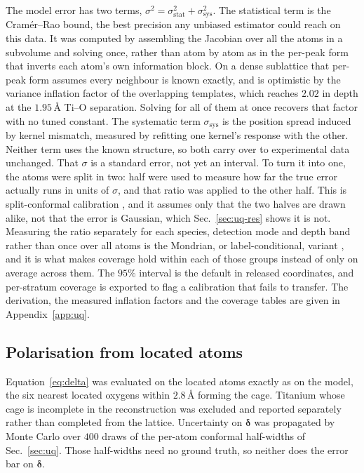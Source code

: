\documentclass[aps,prb,twocolumn,superscriptaddress,floatfix,nofootinbib]{revtex4-2}
\begin{document}
The model error has two terms, $\sigma^2=\sigma^2_{\mathrm{stat}}+\sigma^2_{\mathrm{sys}}$. The statistical term is the Cram\'er--Rao bound, the best precision any unbiased estimator could reach on this data. It was computed by assembling the Jacobian over all the atoms in a subvolume and solving once, rather than atom by atom as in the per-peak form that inverts each atom's own information block. On a dense sublattice that per-peak form assumes every neighbour is known exactly, and is optimistic by the variance inflation factor of the overlapping templates, which reaches $2.02$ in depth at the $1.95$\,\AA{} Ti--O separation. Solving for all of them at once recovers that factor with no tuned constant. The systematic term $\sigma_{\mathrm{sys}}$ is the position spread induced by kernel mismatch, measured by refitting one kernel's response with the other. Neither term uses the known structure, so both carry over to experimental data unchanged. That $\sigma$ is a standard error, not yet an interval. To turn it into one, the atoms were split in two: half were used to measure how far the true error actually runs in units of $\sigma$, and that ratio was applied to the other half. This is split-conformal calibration \citep{Papadopoulos2002}, and it assumes only that the two halves are drawn alike, not that the error is Gaussian, which Sec.~\ref{sec:uq-res} shows it is not. Measuring the ratio separately for each species, detection mode and depth band rather than once over all atoms is the Mondrian, or label-conditional, variant \citep{Vovk2005}, and it is what makes coverage hold within each of those groups instead of only on average across them. The $95\%$ interval is the default in released coordinates, and per-stratum coverage is exported to flag a calibration that fails to transfer. The derivation, the measured inflation factors and the coverage tables are given in Appendix~\ref{app:uq}.

\subsection{Polarisation from located atoms}

Equation~\eqref{eq:delta} was evaluated on the located atoms exactly as on the model, the six nearest located oxygens within $2.8$\,\AA{} forming the cage. Titanium whose cage is incomplete in the reconstruction was excluded and reported separately rather than completed from the lattice. Uncertainty on $\boldsymbol{\delta}$ was propagated by Monte Carlo over $400$ draws of the per-atom conformal half-widths of Sec.~\ref{sec:uq}. Those half-widths need no ground truth, so neither does the error bar on $\boldsymbol{\delta}$.
\end{document}
